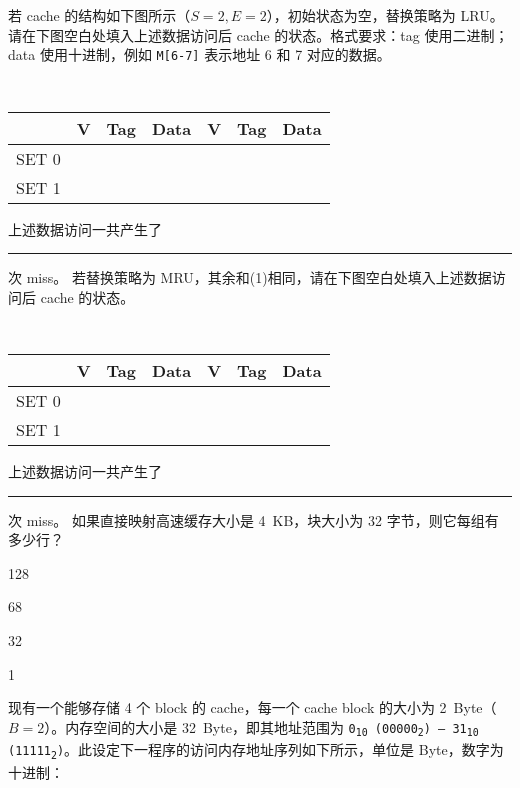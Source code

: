 \begin{problems}
\begin{center}
        \end{center}
        \qn 若 cache 的结构如下图所示（$S=2, E=2$），初始状态为空，替换策略为 LRU。请在下图空白处填入上述数据访问后 cache 的状态。格式要求：tag 使用二进制；data 使用十进制，例如 \verb|M[6-7]| 表示地址 6 和 7 对应的数据。
        \begin{table}[H]
            \tt
            \centering
            \begin{tabular}{|c|c|c|c|c|c|c|}
                \hline
                & {\quad V \quad} & {\quad Tag \quad} & {\quad Data \quad} & {\quad V \quad} & {\quad Tag \quad} & {\quad Data \quad} \\ \hline
                SET 0 &  &  &  &  &  &  \\ \hline
                SET 1 &  &  &  &  &  &  \\ \hline
            \end{tabular}
        \end{table}
        上述数据访问一共产生了 \rule{2.5cm}{0.25mm} 次 miss。
        \qn 若替换策略为 MRU，其余和(1)相同，请在下图空白处填入上述数据访问后 cache 的状态。
        \begin{table}[H]
            \tt
            \centering
            \begin{tabular}{|c|c|c|c|c|c|c|}
                \hline
                & {\quad V \quad} & {\quad Tag \quad} & {\quad Data \quad} & {\quad V \quad} & {\quad Tag \quad} & {\quad Data \quad} \\ \hline
                SET 0 &  &  &  &  &  &  \\ \hline
                SET 1 &  &  &  &  &  &  \\ \hline
            \end{tabular}
        \end{table}
        上述数据访问一共产生了 \rule{2.5cm}{0.25mm} 次 miss。
         如果直接映射高速缓存大小是 \SI{4}{KB}，块大小为 32 字节，则它每组有多少行？
        \begin{choices}
            \item 128
            \item 68
            \item 32
            \item 1
        \end{choices}
         现有一个能够存储 4 个 block 的 cache，每一个 cache block 的大小为 \SI{2}{Byte}（$B=2$）。内存空间的大小是 \SI{32}{Byte}，即其地址范围为 \texttt{0\textsubscript{10} (00000\textsubscript{2}) --- 31\textsubscript{10} (11111\textsubscript{2})}。此设定下一程序的访问内存地址序列如下所示，单位是 Byte，数字为十进制：

\end{problems}
